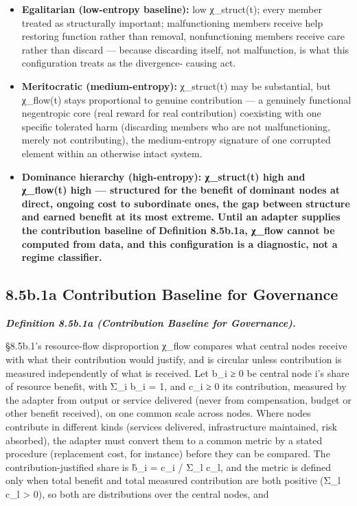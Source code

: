 \documentclass[
]{article}
\begin{document}
\begin{itemize}
\item
  \textbf{Egalitarian (low-entropy baseline):} low χ\_struct(t); every
  member treated as structurally important; malfunctioning members
  receive help restoring function rather than removal, nonfunctioning
  members receive care rather than discard --- because discarding
  itself, not malfunction, is what this configuration treats as the
  divergence- causing act.
\item
  \textbf{Meritocratic (medium-entropy):} χ\_struct(t) may be
  substantial, but χ\_flow(t) stays proportional to genuine contribution
  --- a genuinely functional negentropic core (real reward for real
  contribution) coexisting with one specific tolerated harm (discarding
  members who are not malfunctioning, merely not contributing), the
  medium-entropy signature of one corrupted element within an otherwise
  intact system.
\item
  \textbf{Dominance hierarchy (high-entropy): χ\_struct(t) high and
  χ\_flow(t) high --- structured for the benefit of dominant nodes at
  direct, ongoing cost to subordinate ones, the gap between structure
  and earned benefit at its most extreme. Until an adapter supplies the
  contribution baseline of Definition 8.5b.1a, χ\_flow cannot be
  computed from data, and this configuration is a diagnostic, not a
  regime classifier.}
\end{itemize}

\hypertarget{b.1a-contribution-baseline-for-governance}{%
\subsection{8.5b.1a Contribution Baseline for
Governance}\label{b.1a-contribution-baseline-for-governance}}

\emph{\textbf{Definition 8.5b.1a (Contribution Baseline for
Governance).}}

§8.5b.1's resource-flow disproportion χ\_flow compares what central
nodes receive with what their contribution would justify, and is
circular unless contribution is measured independently of what is
received. Let b\_i ≥ 0 be central node i's share of resource benefit,
with Σ\_i b\_i = 1, and c\_i ≥ 0 its contribution, measured by the
adapter from output or service delivered (never from compensation,
budget or other benefit received), on one common scale across nodes.
Where nodes contribute in different kinds (services delivered,
infrastructure maintained, risk absorbed), the adapter must convert them
to a common metric by a stated procedure (replacement cost, for
instance) before they can be compared. The contribution-justified share
is b̂\_i = c\_i / Σ\_l c\_l, and the metric is defined only when total
benefit and total measured contribution are both positive (Σ\_l c\_l
\textgreater{} 0), so both are distributions over the central nodes, and
\end{document}
